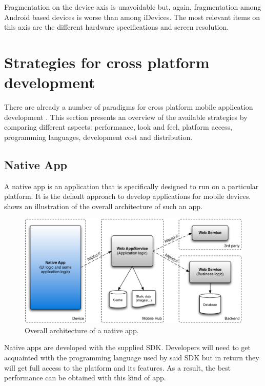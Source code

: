 \npar Fragmentation on the device axis is unavoidable but, again, fragmentation among Android based devices is worse than among iDevices. The most relevant items on this axis are the different hardware specifications and screen resolution.

\npar 

\section{Strategies for cross platform development}

\npar There are already a number of paradigms for cross platform mobile application development \citep{Friese}. This section presents an overview of the available strategies by comparing different aspects: performance, look and feel, platform access, programming languages, development cost and distribution.


\subsection{Native App}

\npar A native app is an application that is specifically designed to run on a particular platform. It is the default approach to develop applications for mobile devices.  shows an illustration of the overall architecture of such an app. 

\begin{figure}[h!]
    \begin{center}
        \includegraphics[width=\textwidth]{figs/native.pdf}
        \caption{
            Overall architecture of a native app. 
        }
        \label{fig:native}
    \end{center}
\end{figure}

\npar Native apps are developed with the supplied SDK. Developers will need to get acquainted with the programming language used by said SDK but in return they will get full access to the platform and its features. As a result, the best performance can be obtained with this kind of app.

